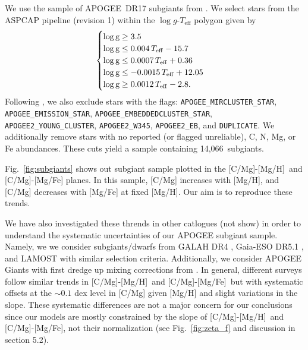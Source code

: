 \documentclass[fleqn,
usenatbib]{mnras}
\newcommand{\nsubgiants}{14,066}
\newcommand{\apogee}{APOGEE}
\newcommand{\caah}{[C/Mg]-[Mg/H]}
\newcommand{\caafe}{[C/Mg]-[Mg/Fe]}
\newcommand{\dbadd}[1]{{\color{Thistle} #1}}
\begin{document}
We use the sample of \apogee\ DR17 subgiants from \citet{jack}. We select stars from the ASPCAP pipeline (revision 1) within the $\log g$-$T_\text{eff}$ polygon given by
 \begin{equation}
    \begin{cases} \label{eq:subgiant_selection}
        \log \text{g} \geq 3.5 \\
        \log \text{g} \leq 0.004\,T_{\rm eff} - 15.7 \\
        \log \text{g} \leq 0.0007\,T_{\rm eff} + 0.36 \\
        \log \text{g} \leq -0.0015\,T_{\rm eff} + 12.05 \\
        \log \text{g} \geq 0.0012\,T_{\rm eff} - 2.8. \\
    \end{cases}
\end{equation}
Following \citet{jack}, we also exclude stars with the flags:
        \verb|APOGEE_MIRCLUSTER_STAR|,
        \verb|APOGEE_EMISSION_STAR|,
        \verb|APOGEE_EMBEDDEDCLUSTER_STAR|,
        \verb|APOGEE2_YOUNG_CLUSTER|,
        \verb|APOGEE2_W345|,
        \verb|APOGEE2_EB|, and
        \verb|DUPLICATE|.
We additionally remove stars with no reported (or flagged unreliable), C, N, Mg, or Fe abundances. These cuts yield a sample containing \nsubgiants\ subgiants.


Fig.~\ref{fig:subgiants} shows out subgiant sample plotted in the \caah\ and \caafe{} planes.\footnotemark{} In this sample, [C/Mg] increases with [Mg/H], and [C/Mg] decreases with [Mg/Fe] at fixed [Mg/H]. Our aim is to reproduce these trends.



We have also investigated these thrends in other catlogues (not show) in order to understand the systematic uncertainties of our APOGEE subgiant sample.
Namely, we we consider subgiants/dwarfs from GALAH DR4 \citep{galah_dr4}, Gaia-ESO DR5.1 \citep{gaiaeso_dr5.1}, and LAMOST \citep{lamost} with similar selection criteria. Additionally, we consider APOGEE Giants with first dredge up mixing corrections from \citep{vincenzo+21}.
In general, different surveys follow similar trends in \caah\ and \caafe\ but with systematic offsets at the $\sim{0.1}$ dex level in [C/Mg] given [Mg/H] and slight variations in the slope.
These systematic differences are not a major concern for our conclusions since our models are mostly constrained by the slope of \caah\ and \caafe,  not their normalization (see Fig.~\ref{fig:zeta_f} and discussion in section \dbadd{5.2}).
\end{document}
